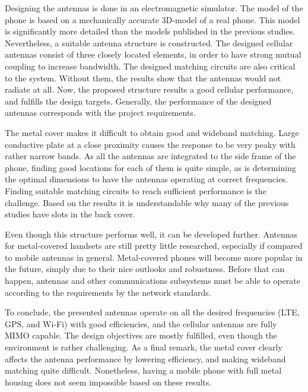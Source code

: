 Designing the antennas is done in an electromagnetic simulator. The model of the phone is based on a mechanically accurate 3D-model of a real phone. This model is significantly more detailed than the models published in the previous studies. Nevertheless, a suitable antenna structure is constructed. The designed cellular antennas consist of three closely located elements, in order to have strong mutual coupling to increase bandwidth. The designed matching circuits are also critical to the system. Without them, the results show that the antennas would not radiate at all. Now, the proposed structure results a good cellular performance, and fulfills the design targets. Generally, the performance of the designed antennas corresponds with the project requirements.

The metal cover makes it difficult to obtain good and wideband matching. Large conductive plate at a close proximity causes the response to be very peaky with rather narrow bands. As all the antennas are integrated to the side frame of the phone, finding good locations for each of them is quite simple, as is determining the optimal dimensions to have the antennas operating at correct frequencies. Finding suitable matching circuits to reach sufficient performance is the challenge. Based on the results it is understandable why many of the previous studies have slots in the back cover.

Even though this structure performs well, it can be developed further. Antennas for metal-covered handsets are still pretty little researched, especially if compared to mobile antennas in general. Metal-covered phones will become more popular in the future, simply due to their nice outlooks and robustness. Before that can happen, antennas and other communications subsystems must be able to operate according to the requirements by the network standards.

To conclude, the presented antennas operate on all the desired frequencies (LTE, GPS, and Wi-Fi) with good efficiencies, and the cellular antennas are fully MIMO capable. The design objectives are mostly fulfilled, even though the environment is rather challenging. As a final remark, the metal cover clearly affects the antenna performance by lowering efficiency, and making wideband matching quite difficult. Nonetheless, having a mobile phone with full metal housing does not seem impossible based on these results.


\clearpage